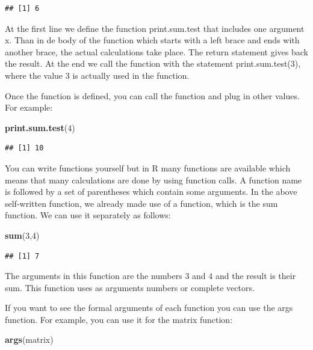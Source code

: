 \documentclass[]{book}
\newenvironment{Shaded}{\begin{snugshade}}{\end{snugshade}}
\newcommand{\KeywordTok}[1]{\textcolor[rgb]{0.13,0.29,0.53}{\textbf{#1}}}
\newcommand{\DecValTok}[1]{\textcolor[rgb]{0.00,0.00,0.81}{#1}}
\newcommand{\NormalTok}[1]{#1}
\theoremstyle{definition}
\theoremstyle{definition}
\theoremstyle{definition}
\theoremstyle{remark}
\begin{document}
\begin{verbatim}
## [1] 6
\end{verbatim}

At the first line we define the function print.sum.test that includes
one argument x. Than in de body of the function which starts with a left
brace and ends with another brace, the actual calculations take place.
The return statement gives back the result. At the end we call the
function with the statement print.sum.test(3), where the value 3 is
actually used in the function.

Once the function is defined, you can call the function and plug in
other values. For example:

\begin{Shaded}
\begin{Highlighting}[]
\KeywordTok{print.sum.test}\NormalTok{(}\DecValTok{4}\NormalTok{)}
\end{Highlighting}
\end{Shaded}

\begin{verbatim}
## [1] 10
\end{verbatim}

You can write functions yourself but in R many functions are available
which means that many calculations are done by using function calls. A
function name is followed by a set of parentheses which contain some
arguments. In the above self-written function, we already made use of a
function, which is the sum function. We can use it separately as
follows:

\begin{Shaded}
\begin{Highlighting}[]
\KeywordTok{sum}\NormalTok{(}\DecValTok{3}\NormalTok{,}\DecValTok{4}\NormalTok{)}
\end{Highlighting}
\end{Shaded}

\begin{verbatim}
## [1] 7
\end{verbatim}

The arguments in this function are the numbers 3 and 4 and the result is
their sum. This function uses as arguments numbers or complete vectors.

If you want to see the formal arguments of each function you can use the
args function. For example, you can use it for the matrix function:

\begin{Shaded}
\begin{Highlighting}[]
\KeywordTok{args}\NormalTok{(matrix)}
\end{Highlighting}
\end{Shaded}
\end{document}
